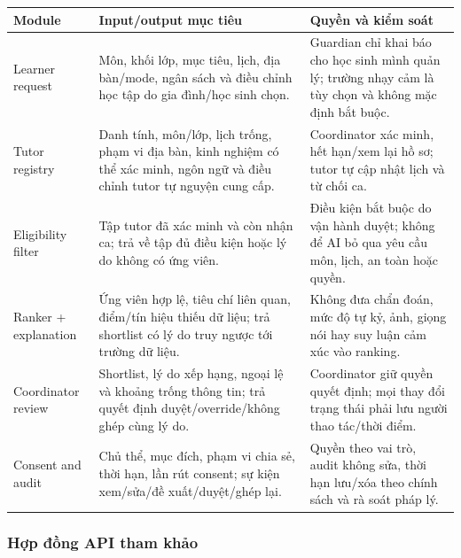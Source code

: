 \documentclass[11pt,a4paper]{article}
\begin{document}
\begin{tabularx}{\textwidth}{p{2.8cm}p{5.1cm}Y}
\toprule
\textbf{Module} & \textbf{Input/output mục tiêu} & \textbf{Quyền và kiểm soát} \\
\midrule
Learner request & Môn, khối lớp, mục tiêu, lịch, địa bàn/mode, ngân sách và
điều chỉnh học tập do gia đình/học sinh chọn. & Guardian chỉ khai báo cho học
sinh mình quản lý; trường nhạy cảm là tùy chọn và không mặc định bắt buộc. \\
Tutor registry & Danh tính, môn/lớp, lịch trống, phạm vi địa bàn, kinh nghiệm
có thể xác minh, ngôn ngữ và điều chỉnh tutor tự nguyện cung cấp. & Coordinator
xác minh, hết hạn/xem lại hồ sơ; tutor tự cập nhật lịch và từ chối ca. \\
Eligibility filter & Tập tutor đã xác minh và còn nhận ca; trả về tập đủ điều
kiện hoặc lý do không có ứng viên. & Điều kiện bắt buộc do vận hành duyệt; không
để AI bỏ qua yêu cầu môn, lịch, an toàn hoặc quyền. \\
Ranker + explanation & Ứng viên hợp lệ, tiêu chí liên quan, điểm/tín hiệu thiếu
dữ liệu; trả shortlist có lý do truy ngược tới trường dữ liệu. & Không đưa chẩn
đoán, mức độ tự kỷ, ảnh, giọng nói hay suy luận cảm xúc vào ranking. \\
Coordinator review & Shortlist, lý do xếp hạng, ngoại lệ và khoảng trống thông
tin; trả quyết định duyệt/override/không ghép cùng lý do. & Coordinator giữ
quyền quyết định; mọi thay đổi trạng thái phải lưu người thao tác/thời điểm. \\
Consent and audit & Chủ thể, mục đích, phạm vi chia sẻ, thời hạn, lần rút
consent; sự kiện xem/sửa/đề xuất/duyệt/ghép lại. & Quyền theo vai trò, audit
không sửa, thời hạn lưu/xóa theo chính sách và rà soát pháp lý. \\
\bottomrule
\end{tabularx}

\clearpage
\subsubsection{Hợp đồng API tham khảo}
\end{document}

